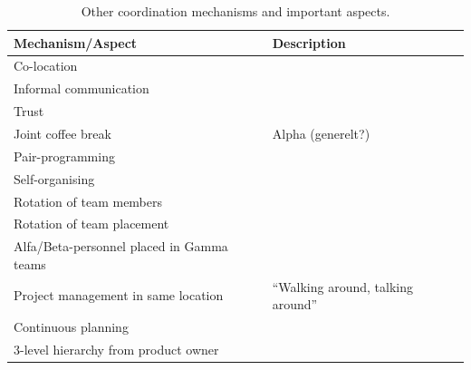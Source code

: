 \begin{table}[H]
\begin{center}
    \begin{tabular}{| p{6cm} | p{9cm} |}
    \hline
    \textbf{Mechanism/Aspect} & \textbf{Description} \\ \hline
    Co-location & \\ \hline
    Informal communication & \\ \hline
    Trust & \\ \hline
    Joint coffee break & Alpha (generelt?) \\ \hline
    Pair-programming & \\ \hline
    Self-organising & \\ \hline
    Rotation of team members & \\ \hline
    Rotation of team placement & \\ \hline
    Alfa/Beta-personnel placed in Gamma teams & \\ \hline
    Project management in same location & ``Walking around, talking around'' \\ \hline
    Continuous planning & \\ \hline
    3-level hierarchy from product owner & \\ \hline
    \end{tabular}
    \caption{Other coordination mechanisms and important aspects.}
    \label{ocmaia}
\end{center}
\end{table}